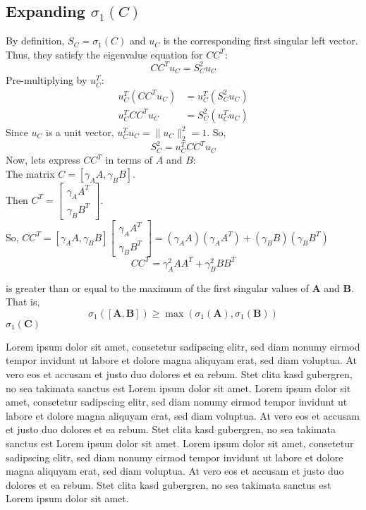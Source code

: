 \subsection{Expanding $\sigma_1(C)$}
By definition, $S_{C} = \sigma_1(C)$ and $u_{C}$ is the corresponding first
singular left vector. Thus, they satisfy the eigenvalue equation for $CC^T$:
\[ CC^Tu_{C} = S_{C}^2 u_{C} \]
Pre-multiplying by $u_{C}^T$:
\begin{align}
    u_{C}^T(CC^T u_{C}) &= u_{C}^T(S_{C}^2 u_{C}) \\
    u_{C}^T CC^T u_{C} &= S_{C}^2 (u_{C}^T u_{C})
\end{align}
Since $u_{C}$ is a unit vector, $u_{C}^T u_{C} = \parallel u_{C} \parallel_2^2 =
1$. So,
\[ S_{C}^2 = u_{C}^T CC^T u_{C} \]
Now, lets express $CC^T$ in terms of $A$ and $B$:\\
The matrix $C = [\gamma_{A}A,\gamma_{B}B]$.\\
Then $C^T = \begin{bmatrix} \gamma_{A}A^T \\ \gamma_{B}B^T \end{bmatrix}$.\\
So, $CC^T = [\gamma_{A}A,\gamma_{B}B]\begin{bmatrix} \gamma_{A}A^T \\
\gamma_{B}B^T \end{bmatrix} = (\gamma_{A}A)(\gamma_{A}A^T) +
(\gamma_{B}B)(\gamma_{B}B^T)$
\[ CC^T = \gamma_{A}^2AA^T + \gamma_{B}^2BB^T \]




 is greater than or equal to the maximum of the first singular
values of $\mathbf{A}$ and $\mathbf{B}$. That is,
\[ \sigma_1([\mathbf{A},
\mathbf{B}]) \geq \max(\sigma_1(\mathbf{A}), \sigma_1(\mathbf{B})) \]
$\sigma_1(\mathbf{C})$




Lorem ipsum dolor sit amet, consetetur sadipscing elitr, sed diam
nonumy eirmod tempor invidunt ut labore et dolore magna aliquyam erat,
sed diam voluptua. At vero eos et accusam et justo duo dolores et ea
rebum. Stet clita kasd gubergren, no sea takimata sanctus est Lorem
ipsum dolor sit amet. Lorem ipsum dolor sit amet, consetetur
sadipscing elitr, sed diam nonumy eirmod tempor invidunt ut labore et
dolore magna aliquyam erat, sed diam voluptua. At vero eos et accusam
et justo duo dolores et ea rebum. Stet clita kasd gubergren, no sea
takimata sanctus est Lorem ipsum dolor sit amet. Lorem ipsum dolor sit
amet, consetetur sadipscing elitr, sed diam nonumy eirmod tempor
invidunt ut labore et dolore magna aliquyam erat, sed diam voluptua.
At vero eos et accusam et justo duo dolores et ea rebum. Stet clita
kasd gubergren, no sea takimata sanctus est Lorem ipsum dolor sit
amet.

